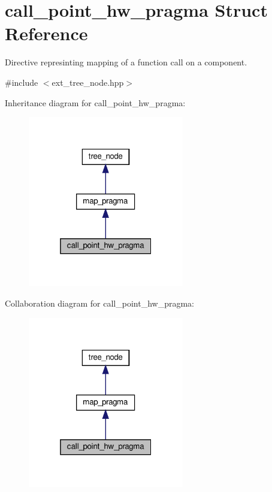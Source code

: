 \hypertarget{structcall__point__hw__pragma}{}\section{call\+\_\+point\+\_\+hw\+\_\+pragma Struct Reference}
\label{structcall__point__hw__pragma}


Directive represinting mapping of a function call on a component.  




{\ttfamily \#include $<$ext\+\_\+tree\+\_\+node.\+hpp$>$}



Inheritance diagram for call\+\_\+point\+\_\+hw\+\_\+pragma\+:
\nopagebreak
\begin{figure}[H]
\begin{center}
\leavevmode
\includegraphics[width=193pt]{d4/dd2/structcall__point__hw__pragma__inherit__graph}
\end{center}
\end{figure}


Collaboration diagram for call\+\_\+point\+\_\+hw\+\_\+pragma\+:
\nopagebreak
\begin{figure}[H]
\begin{center}
\leavevmode
\includegraphics[width=193pt]{d0/d83/structcall__point__hw__pragma__coll__graph}
\end{center}
\end{figure}
